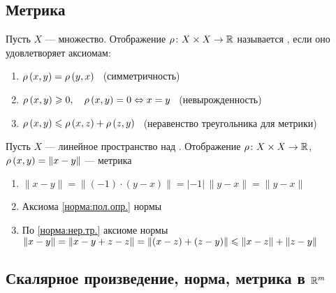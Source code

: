 \subsection{Метрика}

\begin{opr} %
	Пусть $X$ --- множество. Отображение $\rho\colon X \times X \to \mathbb R$ называется , если оно удовлетворяет аксиомам:
	\begin{enumerate} %
		\item {} 
		$\rho\left(x,y\right) = \rho\left(y,x\right)$
		\ {\footnotesize(симметричность)}
		
		\item {} 
		$\rho\left(x,y\right)\geqslant 0, \quad \rho\left(x,y\right) = 0 \Leftrightarrow x = y$
		\ {\footnotesize(невырожденность)}
		
		\item {} 
		$\rho\left(x,y\right) \leqslant \rho\left(x,z\right) + \rho\left(z,y\right)$
		\ {\footnotesize(неравенство треугольника для метрики)}
	\end{enumerate} %
\end{opr} %

\begin{utv}\label{метр.:норма} %
	Пусть $X$ --- линейное пространство над \rr. Отображение $\rho\colon X \times X \to \mathbb R$,  $\rho\left(x,y\right) = \|x-y\|$ --- метрика
\end{utv}

\begin{prf}
	\begin{enumerate}
		\item {} 
		$\|x - y\| = \|(-1)\cdot (y - x)\| = |-1|\,\|y - x\| = \|y - x\|$
		
		\item Аксиома \ref{норма:пол.опр.} нормы
		
		\item По \ref{норма:нер.тр.} аксиоме нормы  
		$\|x - y\| = \|x - y + z - z\| = \|(x - z) + (z - y)\| \leqslant \|x - z\| + \|z - y\|$ 
	\end{enumerate} %
\end{prf}

\subsection{Скалярное произведение, норма, метрика в $\mathbb R^m$}

